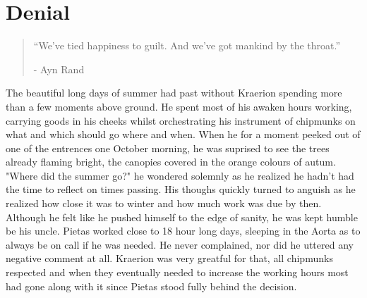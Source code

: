 \chapter{Denial}

\vspace{-1.3cm}
\begin{localsize}{10}
  \begin{quote}
    “We've tied happiness to guilt. And we've got mankind by the throat.”
    \begin{flushright}- Ayn Rand \end{flushright}
  \end{quote} 
\end{localsize}
\vspace{1cm}



The beautiful long days of summer had past without Kraerion spending more than a few moments above ground. He spent most of his awaken hours working, carrying goods in his cheeks whilst orchestrating his instrument of chipmunks on what and which should go where and when. When he for a moment peeked out of one of the entrences one October morning, he was suprised to see the trees already flaming bright, the canopies covered in the orange colours of autum. "Where did the summer go?" he wondered solemnly as he realized he hadn't had the time to reflect on times passing. His thoughs quickly turned to anguish as he realized how close it was to winter and how much work was due by then. Although he felt like he pushed himself to the edge of sanity, he was kept humble be his uncle. Pietas worked close to 18 hour long days, sleeping in the Aorta as to always be on call if he was needed. He never complained, nor did he uttered any negative comment at all. Kraerion was very greatful for that, all chipmunks respected and when they eventually needed to increase the working hours most had gone along with it since Pietas stood fully behind the decision.







